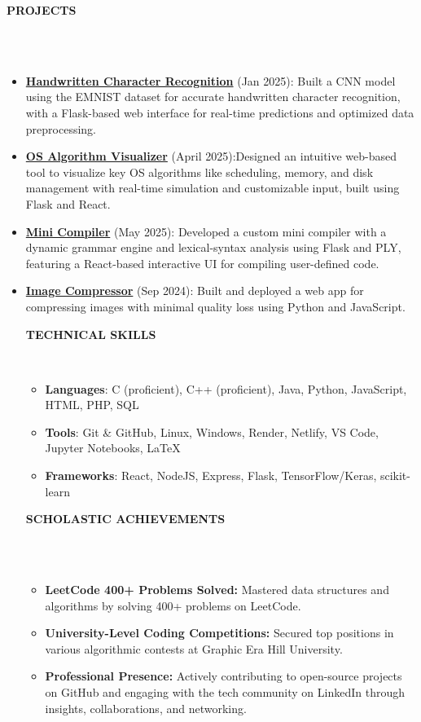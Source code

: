 \documentclass[a4paper,10pt]{article}
\newcommand{\lsep}{-0.5cm}
\newcommand{\resheading}[1]{{\small \colorbox{mygrey}{\begin{minipage}{0.975\textwidth}{\textbf{#1 \vphantom{p\^{E}}}}\end{minipage}}}}
\begin{document}
\resheading{\textbf{PROJECTS} }\\[\lsep]
\\
\begin{itemize}
\setlength\itemsep{0.5em}
\item \textbf{\href{https://github.com/VinodPandey14/Handwritten-Character-Recognition}{Handwritten Character Recognition}} (Jan 2025):  Built a CNN model using the EMNIST dataset for accurate handwritten character recognition, with a Flask-based web interface for real-time predictions and optimized data preprocessing.


\item \textbf{\href{https://github.com/VinodPandey14/OS-Algorithm-Visualizer}{OS Algorithm Visualizer}} (April 2025):Designed an intuitive web-based tool to visualize key OS algorithms like scheduling, memory, and disk management with real-time simulation and customizable input, built using Flask and React.

\item \textbf{\href{https://github.com/VinodPandey14/Mini-Compiler}{Mini Compiler}} (May 2025):  Developed a custom mini compiler with a dynamic grammar engine and lexical-syntax analysis using Flask and PLY, featuring a React-based interactive UI for compiling user-defined code.

\item \textbf{\href{https://compress-img.netlify.app/}{Image Compressor}} (Sep 2024): Built and deployed a web app for compressing images with minimal quality loss using Python and JavaScript.

\resheading{\textbf{TECHNICAL SKILLS} }\\[\lsep]
\begin{itemize}
\setlength\itemsep{0em}
\item \noindent \textbf{Languages}: C (proficient), C++ (proficient), Java, Python, JavaScript, HTML, PHP, SQL\\
\item \noindent \textbf{Tools}: Git \& GitHub, Linux, Windows, Render, Netlify, VS Code, Jupyter Notebooks, \LaTeX\\
\item \noindent \textbf{Frameworks}: React, NodeJS, Express, Flask, TensorFlow/Keras, scikit-learn
\end{itemize}

\resheading{\textbf{SCHOLASTIC ACHIEVEMENTS} }\\[\lsep]  
\\  
\begin{itemize}  
\setlength\itemsep{0em}  
\item \textbf{LeetCode 400+ Problems Solved:} Mastered data structures and algorithms by solving 400+ problems on LeetCode.  
\item \textbf{University-Level Coding Competitions:} Secured top positions in various algorithmic contests at Graphic Era Hill University.  
\item \textbf{Professional Presence:} Actively contributing to open-source projects on GitHub and engaging with the tech community on LinkedIn through insights, collaborations, and networking.
\end{itemize}


\end{itemize}
\end{document}

